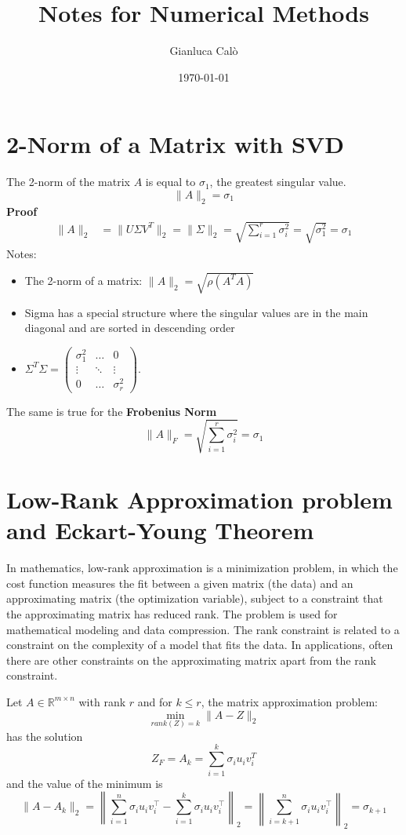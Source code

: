 \documentclass[a4paper, 12pt]{article}
\title{Notes for Numerical Methods}
\author{Gianluca Calò}
\date{\today}
\begin{document}
\maketitle

\section{2-Norm of a Matrix with SVD}
The 2-norm of the matrix $A$ is equal to $\sigma_1$, the greatest singular value.
\[
\|A\|_2 = \sigma_1
\]
\textbf{Proof}
\[
\begin{aligned}
\|A\|_2 &= \|U\Sigma V^T\|_2 = \|\Sigma\|_2 = \sqrt{\sum_{i=1}^r \sigma_i^2} = \sqrt{\sigma_1^2} = \sigma_1
\end{aligned}
\]
Notes:
\begin{itemize}
    \item The 2-norm of a matrix: $\|A\|_2 = \sqrt{\rho(A^TA)}$
    \item Sigma has a special structure where the singular values are in the main diagonal and are sorted in descending order
    \item $\Sigma^T\Sigma = \begin{pmatrix}
        \sigma_1^2 & \ldots & 0 \\
        \vdots & \ddots & \vdots \\
        0 & \ldots & \sigma_r^2
        \end{pmatrix}$.
\end{itemize}

The same is true for the \textbf{Frobenius Norm}
\[
\|A\|_F = \sqrt{\sum_{i=1}^r \sigma_i^2} = \sigma_1
\]

\section{Low-Rank Approximation problem and Eckart-Young Theorem}
In mathematics, low-rank approximation is a minimization problem, in which the cost function measures
the fit between a given matrix (the data) and an approximating matrix (the optimization variable),
subject to a constraint that the approximating matrix has reduced rank. The problem is used for mathematical
modeling and data compression. The rank constraint is related to a constraint on the complexity of a model that
fits the data. In applications, often there are other constraints on the approximating matrix apart from the rank constraint.

Let $A \in \mathbb{R}^{m \times n}$ with rank $r$ and for $k \leq r$, the matrix approximation problem:
\[
\min_{rank(Z)=k} \|A-Z\|_2
\]
has the solution $$Z_F = A_k = \sum_{i=1}^k \sigma_i u_i v_i^T$$ and the value of the minimum is
\[
    \|A-A_{k}\|_{2}=\left\|\sum _{i=1}^{n}\sigma _{i}u_{i}v_{i}^{\top }-\sum _{i=1}^{k}\sigma _{i}u_{i}v_{i}^{\top }\right\|_{2}=\left\|\sum _{i=k+1}^{n}\sigma _{i}u_{i}v_{i}^{\top }\right\|_{2}=\sigma _{k+1}
\]
\end{document}
